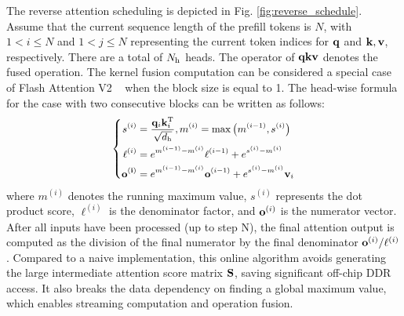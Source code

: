 \documentclass[sigconf]{acmart}
\begin{document}
The reverse attention scheduling is depicted in Fig. \ref{fig:reverse_schedule}. Assume that the current sequence length of the prefill tokens is \( N \), with \( 1 < i \leq N \) and \( 1 < j \leq N \) representing the current token indices for \( {\bf q} \) and \( {\bf k}, {\bf v} \), respectively. There are a total of \( N_{{\text h}} \) heads. The operator of $\bf{qkv}$ denotes the fused operation.
The kernel fusion computation can be considered a special case of Flash Attention V2 ~\cite{dao2022flashattentionfastmemoryefficientexact} when the block size is equal to 1. The head-wise formula for the case with two consecutive blocks can be written as follows:
\begin{equation}
\vspace{-2mm}
\left\{
\begin{small}
\begin{aligned}
  s^{(i)} &= \frac{ {\bf q}_{i}{\bf k}^{\text{T}}_{i}}{\sqrt{d_{\text{h}}}}, m^{(i)} = \max\left(m^{(i-1)}, s^{(i)}\right)\\
\ell^{(i)} &= e^{m^{(i-1)} - m^{(i)}} \ell^{(i-1)} + e^{s^{(i)} - m^{(i)}} \\
\bf{o}^{(i)} &= e^{m^{(i-1)} - m^{(i)}}{ \bf o}^{(i-1)} + e^{s^{(i)} - m^{(i)}} {\bf v}_{i}
\end{aligned}
\end{small}
\right.
\end{equation}
where $m^{(i)}$ denotes the running maximum value, $s^{(i)}$ represents the dot product score, $\ell^{(i)}$ is the denominator factor, and ${\bf o}^{(i)}$ is the numerator vector. After all inputs have been processed (up to step N), the final attention output is computed as the division of the final numerator by the final denominator ${\bf o}^{(i)}/\ell^{(i)}$. 
Compared to a naive implementation, this online algorithm avoids generating the large intermediate attention score matrix $\bf S$, saving significant off-chip DDR access. It also breaks the data dependency on finding a global maximum value, which enables streaming computation and operation fusion.


\end{document}
